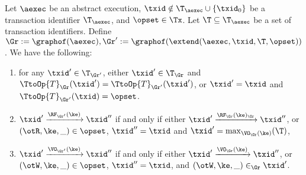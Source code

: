 \begin{lemma}
\label{lem:graph.extend}
Let $\aexec$ be an abstract execution, 
$\txid \notin \T_{\aexec} \cup \{\txid_0\}$ be a transaction identifier $\T_{\aexec}$, and $\opset \in \Tx$. 
Let $\T \subseteq \T_{\aexec}$ be a set of transaction identifiers.
Define $\Gr := \graphof(\aexec), \Gr' := \graphof(\extend(\aexec, \txid, \T, \opset))$. 
We have the following: 
\begin{enumerate}
\item for any $\txid' \in \T_{\Gr'}$, either $\txid' \in \T_{\Gr}$ and $\TtoOp{T}_{\Gr}(\txid') = \TtoOp{T}_{\Gr'}(\txid')$, 
or $\txid' = \txid$ and $\TtoOp{T}_{\Gr'}(\txid) = \opset$.
\item $\txid' \xrightarrow{\RF_{\Gr'}(\ke)} \txid''$ if and only if either 
$\txid' \xrightarrow{\RF_{\Gr}(\ke)_{\Gr}} \txid''$, or $(\otR, \ke, \_) \in \opset$, $\txid'' = \txid$ and 
$\txid' = \max_{\VO_{\Gr}(\ke)}(\T)$, 
\item $\txid' \xrightarrow{\VO_{\Gr'}(\ke)} \txid''$ if and only if 
either $\txid' \xrightarrow{\VO_{\Gr}(\ke)} \txid''$, or $(\otW, \ke, \_) \in \opset$, $\txid'' = \txid$, 
and $(\otW, \ke, \_) \in_{\Gr} \txid'$.
\end{enumerate}
\end{lemma}


